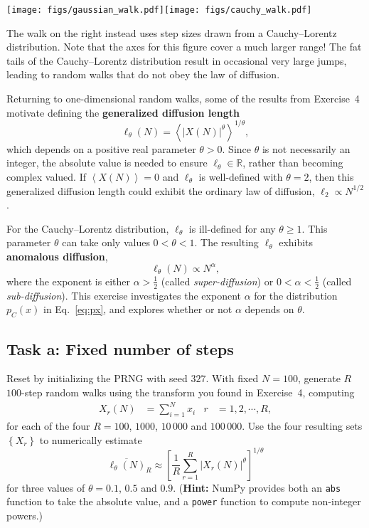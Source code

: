 \documentclass[12 pt]{article} %
\newcommand{\Rbb}{\ensuremath{\mathbb R} }
\newcommand{\al}{\ensuremath{\alpha} }
\newcommand{\vev}[1]{\ensuremath{\left\langle #1 \right\rangle} }
\newcommand{\eq}[1]{Eq.~\ref{#1}}
\begin{document}
\noindent\texttt{[image: figs/gaussian\_walk.pdf]}\hfill \texttt{[image: figs/cauchy\_walk.pdf]} %

The walk on the right instead uses step sizes drawn from a Cauchy--Lorentz distribution.
Note that the axes for this figure cover a much larger range!
The fat tails of the Cauchy--Lorentz distribution result in occasional very large jumps, leading to random walks that do not obey the law of diffusion.

Returning to one-dimensional random walks, some of the results from Exercise~4 motivate defining the \textbf{generalized diffusion length}
\begin{equation}
  \label{eq:diff_length}
  \ell_{\theta}(N) = \vev{|X(N)|^{\theta}}^{1 / \theta},
\end{equation}
which depends on a positive real parameter $\theta > 0$.
Since $\theta$ is not necessarily an integer, the absolute value is needed to ensure $\ell_{\theta} \in \Rbb$, rather than becoming complex valued.
If $\vev{X(N)} = 0$ and $\ell_{\theta}$ is well-defined with $\theta = 2$, then this generalized diffusion length could exhibit the ordinary law of diffusion, $\ell_2 \propto N^{1 / 2}$.

For the Cauchy--Lorentz distribution, $\ell_{\theta}$ is ill-defined for any $\theta \geq 1$.
This parameter $\theta$ can take only values $0 < \theta < 1$.
The resulting $\ell_{\theta}$ exhibits \textbf{anomalous diffusion},
\begin{equation*}
  \ell_{\theta}(N) \propto N^{\al},
\end{equation*}
where the exponent is either $\al > \frac{1}{2}$ (called \textit{super-diffusion}) or $0 < \al < \frac{1}{2}$ (called \textit{sub-diffusion}).
This exercise investigates the exponent \al for the distribution $p_C(x)$ in \eq{eq:px}, and explores whether or not \al depends on $\theta$.

\vfill %
\subsection*{Task a: Fixed number of steps}
Reset by initializing the PRNG with seed $327$.
With fixed $N = 100$, generate $R$ $100$-step random walks using the transform you found in Exercise~4, computing
\begin{align*}
  X_r(N) & = \sum_{i = 1}^N x_i &
  r & = 1, 2, \cdots, R,
\end{align*}
for each of the four $R = 100$, $1000$, $10\,000$ and $100\,000$.
Use the four resulting sets $\left\{X_r\right\}$ to numerically estimate
\begin{equation*}
  \overline{\ell_{\theta}(N)}_R \approx \left[\frac{1}{R} \sum_{r = 1}^R \left|X_r(N)\right|^{\theta}\right]^{1 / \theta}
\end{equation*}
for three values of $\theta = 0.1$, $0.5$ and $0.9$.
(\textbf{Hint:} NumPy provides both an \texttt{abs} function to take the absolute value, and a \texttt{power} function to compute non-integer powers.)
\end{document}
